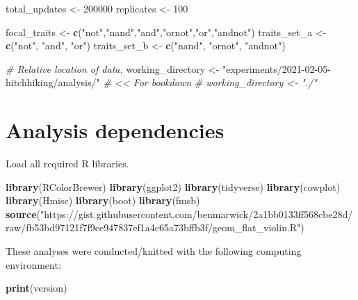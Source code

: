 \documentclass[]{book}
\newenvironment{Shaded}{\begin{snugshade}}{\end{snugshade}}
\newcommand{\CommentTok}[1]{\textcolor[rgb]{0.56,0.35,0.01}{\textit{#1}}}
\newcommand{\DecValTok}[1]{\textcolor[rgb]{0.00,0.00,0.81}{#1}}
\newcommand{\KeywordTok}[1]{\textcolor[rgb]{0.13,0.29,0.53}{\textbf{#1}}}
\newcommand{\NormalTok}[1]{#1}
\newcommand{\StringTok}[1]{\textcolor[rgb]{0.31,0.60,0.02}{#1}}
\begin{document}
\begin{Shaded}
\begin{Highlighting}[]
\NormalTok{total_updates <-}\StringTok{ }\DecValTok{200000}
\NormalTok{replicates <-}\StringTok{ }\DecValTok{100}

\NormalTok{focal_traits <-}\StringTok{ }\KeywordTok{c}\NormalTok{(}\StringTok{"not"}\NormalTok{,}\StringTok{"nand"}\NormalTok{,}\StringTok{"and"}\NormalTok{,}\StringTok{"ornot"}\NormalTok{,}\StringTok{"or"}\NormalTok{,}\StringTok{"andnot"}\NormalTok{)}
\NormalTok{traits_set_a <-}\StringTok{ }\KeywordTok{c}\NormalTok{(}\StringTok{"not"}\NormalTok{, }\StringTok{"and"}\NormalTok{, }\StringTok{"or"}\NormalTok{)}
\NormalTok{traits_set_b <-}\StringTok{ }\KeywordTok{c}\NormalTok{(}\StringTok{"nand"}\NormalTok{, }\StringTok{"ornot"}\NormalTok{, }\StringTok{"andnot"}\NormalTok{)}

\CommentTok{# Relative location of data.}
\NormalTok{working_directory <-}\StringTok{ "experiments/2021-02-05-hitchhiking/analysis/"} \CommentTok{# << For bookdown}
\CommentTok{# working_directory <- "./"}
\end{Highlighting}
\end{Shaded}

\hypertarget{analysis-dependencies-3}{%
\section{Analysis dependencies}\label{analysis-dependencies-3}}

Load all required R libraries.

\begin{Shaded}
\begin{Highlighting}[]
\KeywordTok{library}\NormalTok{(RColorBrewer)}
\KeywordTok{library}\NormalTok{(ggplot2)}
\KeywordTok{library}\NormalTok{(tidyverse)}
\KeywordTok{library}\NormalTok{(cowplot)}
\KeywordTok{library}\NormalTok{(Hmisc)}
\KeywordTok{library}\NormalTok{(boot)}
\KeywordTok{library}\NormalTok{(fmsb)}
\KeywordTok{source}\NormalTok{(}\StringTok{"https://gist.githubusercontent.com/benmarwick/2a1bb0133ff568cbe28d/raw/fb53bd97121f7f9ce947837ef1a4c65a73bffb3f/geom_flat_violin.R"}\NormalTok{)}
\end{Highlighting}
\end{Shaded}

These analyses were conducted/knitted with the following computing environment:

\begin{Shaded}
\begin{Highlighting}[]
\KeywordTok{print}\NormalTok{(version)}
\end{Highlighting}
\end{Shaded}
\end{document}
